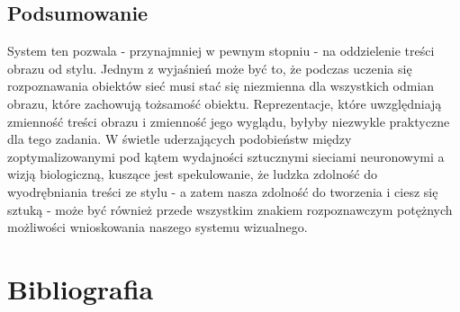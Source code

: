 \documentclass[brudnopis]{xmgr}
\begin{document}
\section{Podsumowanie\label{s:dsssl}}

System ten pozwala - przynajmniej w pewnym stopniu - na oddzielenie treści obrazu od stylu. Jednym z wyjaśnień może być to, że podczas uczenia się rozpoznawania obiektów sieć musi stać się niezmienna dla wszystkich odmian obrazu, które zachowują tożsamość obiektu. Reprezentacje, które uwzględniają zmienność treści obrazu i zmienność jego wyglądu, byłyby niezwykle praktyczne dla tego zadania. W świetle uderzających podobieństw między zoptymalizowanymi pod kątem wydajności sztucznymi sieciami neuronowymi a wizją biologiczną, kuszące jest spekulowanie, że ludzka zdolność do wyodrębniania treści ze stylu - a zatem nasza zdolność do tworzenia i ciesz się sztuką - może być również przede wszystkim znakiem rozpoznawczym potężnych możliwości wnioskowania naszego systemu wizualnego.



\chapter{Bibliografia}
\end{document}
